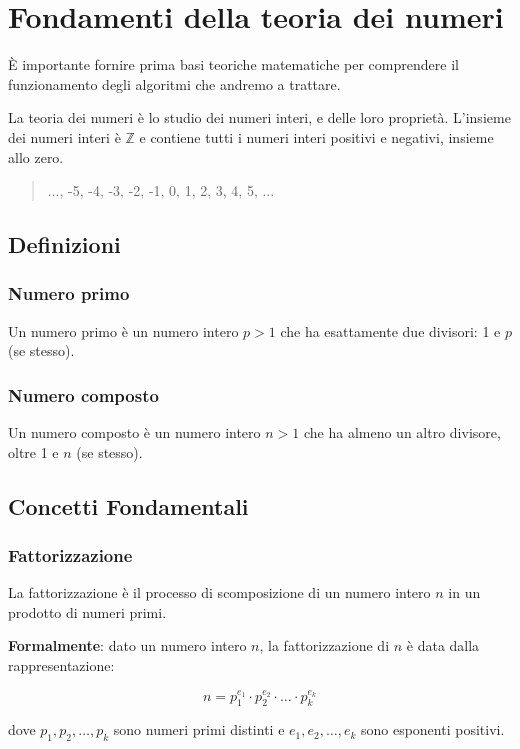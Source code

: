 \documentclass[a4paper,12pt]{report}
\begin{document}
\chapter{Fondamenti della teoria dei numeri}
È importante fornire prima basi teoriche matematiche per comprendere il funzionamento degli algoritmi che andremo a trattare.

La teoria dei numeri è lo studio dei numeri interi, e delle loro proprietà. L'insieme dei numeri interi è $\mathbb{Z}$ e contiene tutti i numeri interi positivi e negativi, insieme allo zero.
\begin{quote}
	\centering
	..., -5, -4, -3, -2, -1, 0, 1, 2, 3, 4, 5, ...
\end{quote}

\section{Definizioni}

\subsection*{Numero primo}
Un numero primo è un numero intero \( p > 1 \) che ha esattamente due divisori: 1 e \(p\) (se stesso).

\subsection*{Numero composto}
Un numero composto è un numero intero \( n > 1 \) che ha almeno un altro divisore, oltre 1 e \( n \) (se stesso).

\section{Concetti Fondamentali}
\subsection*{Fattorizzazione}
La fattorizzazione è il processo di scomposizione di un numero intero \( n \) in un prodotto di numeri primi. 

\textbf{Formalmente}: dato un numero intero \( n \), la fattorizzazione di \( n \) è data dalla rappresentazione: 

\[ n = p_1^{e_1} \cdot p_2^{e_2} \cdot \ldots \cdot p_k^{e_k} \]

dove \( p_1, p_2, \ldots, p_k \) sono numeri primi distinti e \( e_1, e_2, \ldots, e_k \) sono esponenti positivi.
\end{document}
